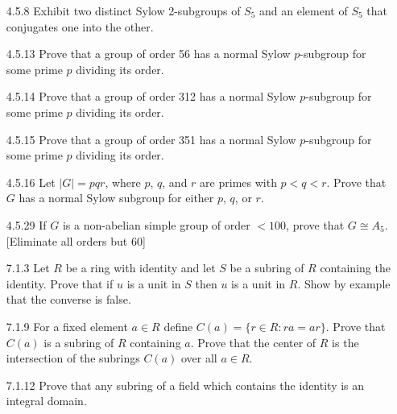 \documentclass[9pt]{article}
\begin{document}
\begin{enumerate}
   \item[4.5.8]   Exhibit two distinct Sylow 2-subgroups of $S_5$ and an element
                  of $S_5$ that conjugates one into the other.
   \item[4.5.13]  Prove that a group of order 56 has a normal Sylow
                  $p$-subgroup for some prime $p$ dividing its order.
   \item[4.5.14]  Prove that a group of order 312 has a normal Sylow
                  $p$-subgroup for some prime $p$ dividing its order.
   \item[4.5.15]  Prove that a group of order 351 has a normal Sylow
                  $p$-subgroup for some prime $p$ dividing its order.
   \item[4.5.16]  Let $|G| = pqr$, where $p$, $q$, and $r$ are primes with
                  $p < q < r$. Prove that $G$ has a normal Sylow subgroup for
                  either $p$, $q$, or $r$.
   \item[4.5.29]  If $G$ is a non-abelian simple group of order $< 100$, prove
                  that $G \cong A_5$. [Eliminate all orders but 60]
   \item[7.1.3]   Let $R$ be a ring with identity and let $S$ be a subring of
                  $R$ containing the identity. Prove that if $u$ is a unit in
                  $S$ then $u$ is a unit in $R$. Show by example that the
                  converse is false.
   \item[7.1.9]   For a fixed element $a \in R$ define
                  $C(a) = \{r \in R : ra = ar\}$. Prove that $C(a)$ is a subring
                  of $R$ containing $a$. Prove that the center of $R$ is the
                  intersection of the subrings $C(a)$ over all $a \in R$.
   \item[7.1.12]  Prove that any subring of a field which contains the identity
                  is an integral domain.
\end{enumerate}
\end{document}
